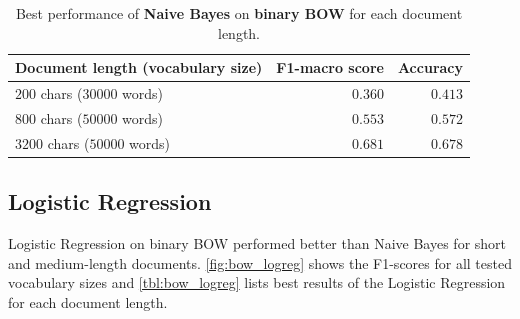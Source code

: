 \begin{table}[h]
	\centering
	\begin{tabular}{|l|r|r|}\hline
		Document length (vocabulary size) & F1-macro score & Accuracy \\
		\hline
		$200$ chars ($30000$ words)    &   $0.360$      & $0.413$       \\
		$800$ chars ($50000$ words)     &  $0.553$   & $0.572$        \\
		$3200$ chars ($50000$ words)    &  $0.681$   & $0.678$    \\
		\hline
	\end{tabular}
	\caption{Best performance of \textbf{Naive Bayes} on \textbf{binary BOW} for each document length.}
	\label{tbl:naivebayes}
\end{table}

\subsection{Logistic Regression}
Logistic Regression on binary BOW performed better than Naive Bayes for short and medium-length documents. \cref{fig:bow_logreg} shows the F1-scores for all tested vocabulary sizes and \cref{tbl:bow_logreg} lists best results of the Logistic Regression for each document length.

